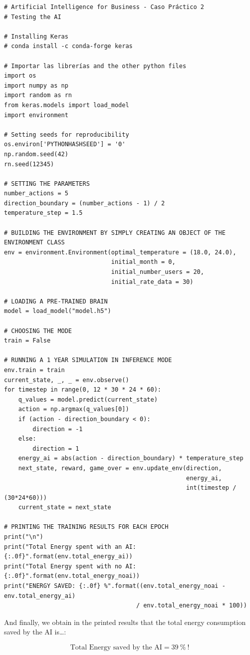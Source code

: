 \documentclass[]{book}
\begin{document}
\begin{lstlisting}
# Artificial Intelligence for Business - Caso Práctico 2
# Testing the AI

# Installing Keras
# conda install -c conda-forge keras

# Importar las librerías and the other python files
import os
import numpy as np
import random as rn
from keras.models import load_model
import environment

# Setting seeds for reproducibility
os.environ['PYTHONHASHSEED'] = '0'
np.random.seed(42)
rn.seed(12345)

# SETTING THE PARAMETERS
number_actions = 5
direction_boundary = (number_actions - 1) / 2
temperature_step = 1.5

# BUILDING THE ENVIRONMENT BY SIMPLY CREATING AN OBJECT OF THE ENVIRONMENT CLASS
env = environment.Environment(optimal_temperature = (18.0, 24.0),
                              initial_month = 0,
                              initial_number_users = 20,
                              initial_rate_data = 30)

# LOADING A PRE-TRAINED BRAIN
model = load_model("model.h5")

# CHOOSING THE MODE
train = False

# RUNNING A 1 YEAR SIMULATION IN INFERENCE MODE
env.train = train
current_state, _, _ = env.observe()
for timestep in range(0, 12 * 30 * 24 * 60):
    q_values = model.predict(current_state)
    action = np.argmax(q_values[0])
    if (action - direction_boundary < 0):
        direction = -1
    else:
        direction = 1
    energy_ai = abs(action - direction_boundary) * temperature_step
    next_state, reward, game_over = env.update_env(direction,
                                                   energy_ai,
                                                   int(timestep / (30*24*60)))
    current_state = next_state

# PRINTING THE TRAINING RESULTS FOR EACH EPOCH
print("\n")
print("Total Energy spent with an AI: {:.0f}".format(env.total_energy_ai))
print("Total Energy spent with no AI: {:.0f}".format(env.total_energy_noai))
print("ENERGY SAVED: {:.0f} %".format((env.total_energy_noai - env.total_energy_ai)
                                     / env.total_energy_noai * 100))
\end{lstlisting}

And finally, we obtain in the printed results that the total energy consumption saved by the AI is\ldots{}:

\begin{equation*}
    \textrm{Total Energy saved by the AI} = 39 \ \% \ !
\end{equation*}
\end{document}
